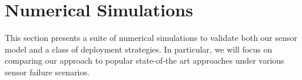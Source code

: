 \documentclass[letterpaper, 10 pt, conference]{ieeeconf}
\begin{document}
\section{Numerical Simulations}
\label{sec:sec7}
This section presents a suite of numerical simulations to validate both our sensor model and a class of deployment strategies. In particular, we will focus on comparing our approach to popular state-of-the art approaches under various sensor failure scenarios.
\end{document}
